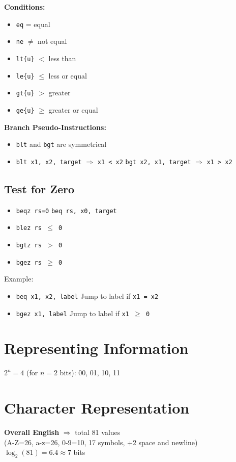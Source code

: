 \documentclass{article}
\begin{document}
\textbf{Conditions:}
\begin{itemize}
    \item \texttt{eq} = equal
    \item \texttt{ne} $\neq$ not equal
    \item \texttt{lt\{u\}} $<$ less than
    \item \texttt{le\{u\}} $\leq$ less or equal
    \item \texttt{gt\{u\}} $>$ greater
    \item \texttt{ge\{u\}} $\geq$ greater or equal
\end{itemize}

\textbf{Branch Pseudo-Instructions:}
\begin{itemize}
    \item \texttt{blt} and \texttt{bgt} are symmetrical
    \item \texttt{blt x1, x2, target} $\Rightarrow$ \texttt{x1 < x2} \quad \texttt{bgt x2, x1, target} $\Rightarrow$ \texttt{x1 > x2}
\end{itemize}

\subsection*{Test for Zero}
\begin{itemize}
    \item \texttt{beqz rs=0} \quad \texttt{beq rs, x0, target}
    \item \texttt{blez rs $\leq$ 0}
    \item \texttt{bgtz rs $>$ 0}
    \item \texttt{bgez rs $\geq$ 0}
\end{itemize}

Example:
\begin{itemize}
    \item \texttt{beq x1, x2, label} \quad Jump to label if \texttt{x1 = x2}
    \item \texttt{bgez x1, label} \quad Jump to label if \texttt{x1 $\geq$ 0}
\end{itemize}

\section*{Representing Information}
$2^n = 4$ (for $n=2$ bits): 00, 01, 10, 11

\section*{Character Representation}
\textbf{Overall English} $\Rightarrow$ total 81 values \\
(A-Z=26, a-z=26, 0-9=10, 17 symbols, +2 space and newline) \\
$\log_2(81) = 6.4 \approx 7$ bits
\end{document}
